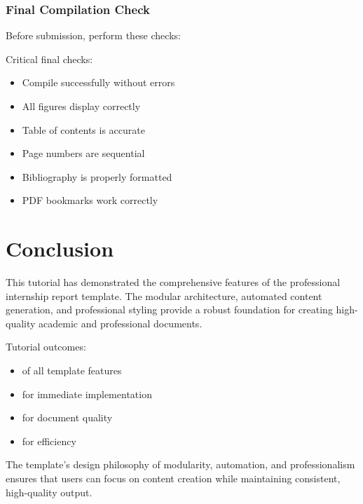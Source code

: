 \documentclass{internshipreport}
\begin{document}
\subsection{Final Compilation Check}

Before submission, perform these checks:

\begin{warningbox}
Critical final checks:
\begin{itemize}
\item Compile successfully without errors
\item All figures display correctly
\item Table of contents is accurate
\item Page numbers are sequential
\item Bibliography is properly formatted
\item PDF bookmarks work correctly
\end{itemize}
\end{warningbox}


\chapter*{Conclusion}

This tutorial has demonstrated the comprehensive features of the professional internship report template. The modular architecture, automated content generation, and professional styling provide a robust foundation for creating high-quality academic and professional documents.\cite{cohn2009succeeding}

\begin{keyfindings}
Tutorial outcomes:
\begin{itemize}
\item {} of all template features
\item {} for immediate implementation
\item {} for document quality
\item {} for efficiency
\end{itemize}
\end{keyfindings}

The template's design philosophy of modularity, automation, and professionalism ensures that users can focus on content creation while maintaining consistent, high-quality output.
\end{document}
